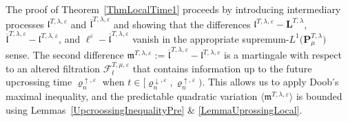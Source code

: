 \documentclass[10pt]{article}
\numberwithin{equation}{section}
\theoremstyle{definition}
\begin{document}
The proof of Theorem~\ref{ThmLocalTime1}  proceeds by introducing intermediary processes $\mathfrak{l}^{T,\lambda,\varepsilon}$ and $\overline{\mathfrak{l}}^{T,\lambda,\varepsilon}$ and showing that  the differences $\mathfrak{l}^{T,\lambda,\varepsilon}-\mathbf{L}^{T,\lambda} $, $\overline{\mathfrak{l}}^{T,\lambda,\varepsilon}-\mathfrak{l}^{T,\lambda,\varepsilon} $, and $\ell^{\varepsilon}-\overline{\mathfrak{l}}^{T,\lambda,\varepsilon} $ vanish in the appropriate supremum-$L^1\big(\mathbf{P}^{T,\lambda}_{\mu}\big)$ sense.  The second difference $\mathfrak{m}^{T,\lambda,\varepsilon}:=\overline{\mathfrak{l}}^{T,\lambda,\varepsilon}-\mathfrak{l}^{T,\lambda,\varepsilon}$ is a martingale with respect to an altered filtration $\boldsymbol{\mathscr{F}}_t^{T,\mu,\varepsilon}$ that contains information  up to the future  upcrossing time $\varrho_{n}^{\uparrow,\varepsilon}$ when $t\in\big[ \varrho_{n}^{\downarrow ,\varepsilon},  \varrho_{n}^{\uparrow,\varepsilon} \big)$.  This allows us to apply Doob's maximal inequality, and  the predictable quadratic variation $\langle \mathfrak{m}^{T,\lambda,\varepsilon}\rangle$  is bounded using Lemmas~\ref{UpcroossingInequalityPre} \& \ref{LemmaUprossingLocal}.
\end{document}

